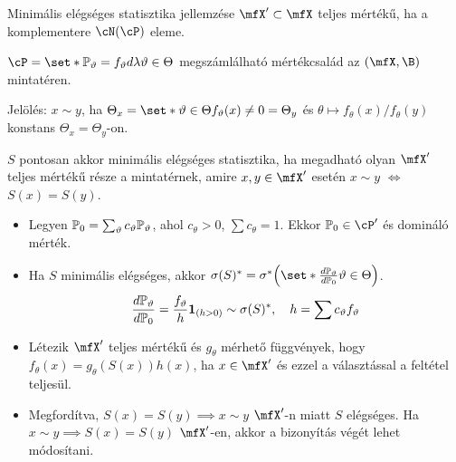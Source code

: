 \documentclass[aspectratio=169,notheorems,9pt,\option]{beamer}
\begin{document}
\begin{frame}{Minimális elégséges statisztika jellemzése}
  $\mfX'\subset\mfX$ teljes mértékű, ha a komplementere $\cN(\cP)$ eleme.
  \begin{proposition}
    $\cP=\set*{\P[\theta]=f_\theta d\lambda}{\theta\in\Theta}$ megszámlálható
    mértékcsalád az $(\mfX,\B)$ mintatéren.
      
    Jelölés: $x\sim y$, ha $\Theta_x=\set*{\theta\in\Theta}{f_\theta(x)\neq0}=\Theta_y$ és 
    $\theta\mapsto f_\theta(x)/f_{\theta}(y)$ konstans $\Theta_x=\Theta_y$-on.

    $S$ pontosan akkor minimális elégséges statisztika, ha megadható olyan $\mfX'$ teljes mértékű része a mintatérnek, 
    amire $x,y\in\mfX'$ esetén $x\sim y$ $\iff$ $S(x)=S(y)$.
  \end{proposition}
  \begin{itemize}
    \item Legyen $\P[0]=\sum_{\theta} c_\theta\P[\theta]$, ahol $c_\theta>0$, $\sum c_\theta=1$. 
      Ekkor $\P[0]\in\cP'$ és domináló mérték.
    \item Ha $S$ minimális elégséges, akkor 
    $\sigma(S)^*=\sigma^*\zjel*{\set*{\frac{d\P[\theta]}{d\P[0]}}{\theta\in\Theta}}$.
    \begin{displaymath}
      \frac{d\P[\theta]}{d\P[0]}=\frac{f_{\theta}}{h}\I{h>0}\sim\sigma(S)^*,\quad h=\sum c_\theta f_\theta
    \end{displaymath}
    \item Létezik $\mfX'$ teljes mértékű és $g_\theta$ mérhető függvények, hogy 
    $f_\theta(x)=g_\theta(S(x))h(x)$, ha $x\in\mfX'$ 
    és ezzel a választással a feltétel teljesül.
    \item Megfordítva, $S(x)=S(y)\implies x\sim y$ $\mfX'$-n miatt $S$ elégséges.
    Ha $x\sim y \implies S(x)=S(y)$  $\mfX'$-en, 
    akkor a bizonyítás végét lehet módosítani.
  \end{itemize}
\end{frame}
\end{document}
